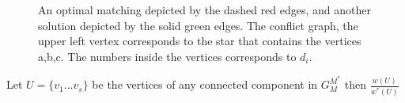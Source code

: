\begin{figure}[h]
\centering

\caption[]{
\label{fig:conflict}
An optimal matching depicted by the dashed red edges,
and another solution depicted by the solid green edges.  
The conflict graph, the upper left vertex corresponds 
to the star that contains the vertices a,b,c.
The numbers inside the vertices corresponds to $d_i$.   
}
\end{figure}  


\begin{observation}
Let $U = \{v_1 \ldots v_s\}$ be the vertices of any connected component in
$G^{M^*}_M$ then $\frac{w(U)}{w^*(U)}$
\end{observation}


